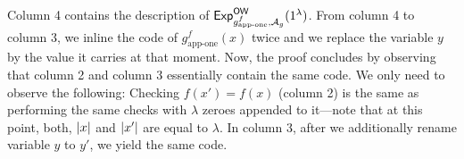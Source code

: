 \documentclass[a4paper,table,dvipsnames]{article}
\theoremstyle{definition}
\begin{document}
Column 4 contains the description of ${\mathsf{Exp}}_{g^f_{\text{app-one}},\mathcal{A}_g}^{\mathsf{OW}}(1^\lambda)$.
From column 4 to column 3, we inline the code of $g^f_{\text{app-one}}(x)$ twice and we replace the variable $y$ by the value it carries at that moment. Now, the proof concludes by observing that column 2 and column 3 essentially contain the same code. We only need to observe the following: Checking $f(x')=f(x)$ (column 2) is the same as performing the same checks with $\lambda$ zeroes appended to it---note that at this point, both, $\left\lvert x\right\rvert$ and  $\left\lvert x'\right\rvert$ are equal to $\lambda$. In column 3, after we additionally rename variable $y$ to $y'$, we yield the same code.

\begin{figure}
\begin{codebox}
	\begin{center}
		\begin{pchstack}
  		\begin{pcvstack}
					\pcvspace
  		\end{pcvstack}
					\pchspace
					\pchspace
\end{pchstack}
\end{center}
\end{codebox}
\end{figure}
\end{document}
